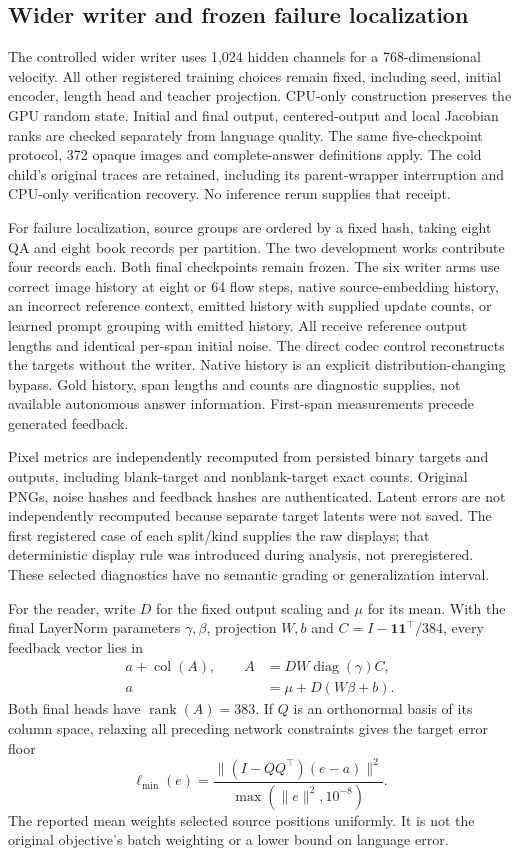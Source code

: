 \documentclass[12pt,a4paper]{article}
\begin{document}
\subsection*{Wider writer and frozen failure localization}
The controlled wider writer uses 1,024 hidden channels for a 768-dimensional
velocity. All other registered training choices remain fixed, including
seed, initial encoder, length head and teacher projection. CPU-only
construction preserves the GPU random state. Initial and final output,
centered-output and local Jacobian ranks are checked separately from
language quality. The same five-checkpoint protocol, 372 opaque images and
complete-answer definitions apply. The cold child's original traces are
retained, including its parent-wrapper interruption and CPU-only verification
recovery. No inference rerun supplies that receipt.

For failure localization, source groups are ordered by a fixed hash, taking
eight QA and eight book records per partition. The two development works
contribute four records each. Both final checkpoints remain frozen. The
six writer arms use correct image history at eight or 64 flow steps, native
source-embedding history, an incorrect reference context, emitted history
with supplied update counts, or learned prompt grouping with emitted
history. All receive reference output lengths and identical per-span initial
noise. The direct codec control reconstructs the targets without the writer.
Native history is an explicit distribution-changing bypass. Gold history,
span lengths and counts are diagnostic supplies, not available autonomous
answer information. First-span measurements precede generated feedback.

Pixel metrics are independently recomputed from persisted binary targets and
outputs, including blank-target and nonblank-target exact counts. Original
PNGs, noise hashes and feedback hashes are authenticated. Latent errors are
not independently recomputed because separate target latents were not saved.
The first registered case of each split/kind supplies the raw displays;
that deterministic display rule was introduced during analysis, not
preregistered. These selected diagnostics have no semantic grading or
generalization interval.

For the reader, write $D$ for the fixed output scaling and $\mu$ for its mean.
With the final LayerNorm parameters $\gamma,\beta$, projection $W,b$ and
$C=I-\mathbf1\mathbf1^\top/384$, every feedback vector lies in
\begin{align}
 a+\operatorname{col}(A),\qquad
 A&=DW\operatorname{diag}(\gamma)C,\\
 a&=\mu+D(W\beta+b).
\end{align}
Both final heads have $\operatorname{rank}(A)=383$. If $Q$ is an
orthonormal basis of its column space, relaxing all preceding network
constraints gives the target error floor
\begin{equation}
 \ell_{\min}(e)=
 \frac{\|(I-QQ^\top)(e-a)\|^2}{\max(\|e\|^2,10^{-8})}.
\end{equation}
The reported mean weights selected source positions uniformly. It is not
the original objective's batch weighting or a lower bound on language error.
\end{document}
